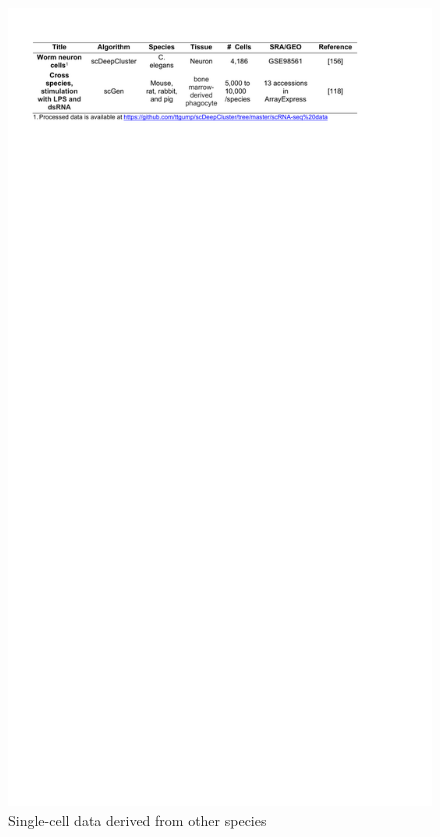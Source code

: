 \documentclass[
]{book}
\begin{document}
\begin{figure}

{\centering \includegraphics[width=19.51in]{Table/Table2d} 

}

\caption{Single-cell data derived from other species}\label{fig:Table2d}
\end{figure}
\end{document}
